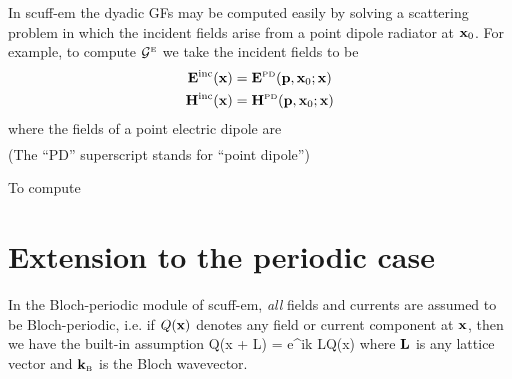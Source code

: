 \documentclass[letterpaper]{article}
\begin{document}
In {\sc scuff-em} the dyadic GFs may be computed easily by solving a
scattering problem in which the incident fields arise from a point dipole
radiator at $\mathbf{x}_0$. For example, to compute $\mathcal{G}^{\hbox{\tiny{E}}}$ we 
take the incident fields to be
\begin{align*}
 \mathbf{E}^{\hbox{\scriptsize{inc}}}(\mathbf{x}) &= \mathbf{E}^{\hbox{\tiny{PD}}}(\mathbf{p}, \mathbf{x}_0; \mathbf{x})
\\
 \mathbf{H}^{\hbox{\scriptsize{inc}}}(\mathbf{x}) &= \mathbf{H}^{\hbox{\tiny{PD}}}(\mathbf{p}, \mathbf{x}_0; \mathbf{x})
\end{align*}
where the fields of a point electric dipole are
\begin{subequations}
\begin{align*}
\end{align*}
\label{PDFields}
\end{subequations}
(The ``PD'' superscript stands for ``point dipole'')

To compute

\section{Extension to the periodic case}

In the Bloch-periodic module of {\sc scuff-em}, \textit{all}
fields and currents are assumed to be Bloch-periodic, i.e.
if $Q(\mathbf{x})$ denotes any field or current component at $\mathbf{x}$,
then we have the built-in assumption
{Q(\vb x + \vb L) = e^{i\vb k \cdot \vb L}Q(\vb x)}
where $\mathbf{L}$ is any lattice vector and 
$\mathbf{k}_{\hbox{\tiny{B}}}$ is the Bloch wavevector.
\end{document}
